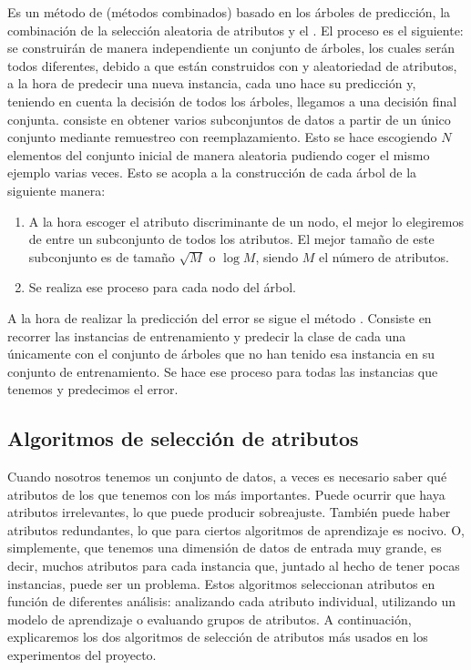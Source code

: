 Es un método de  (métodos combinados) basado en los árboles de predicción, la combinación de la selección aleatoria de atributos y el . El proceso es el siguiente: se construirán de manera independiente un conjunto de árboles, los cuales serán todos diferentes, debido a que están construidos con  y aleatoriedad de atributos, a la hora de predecir una nueva instancia, cada uno hace su predicción y, teniendo en cuenta la decisión de todos los árboles, llegamos a una decisión final conjunta.  consiste en obtener varios subconjuntos de datos a partir de un único conjunto mediante remuestreo con reemplazamiento. Esto se hace escogiendo $N$ elementos del conjunto inicial de manera aleatoria pudiendo coger el mismo ejemplo varias veces. Esto se acopla a la construcción de cada árbol de la siguiente manera:
\begin{enumerate}
	\item A la hora escoger el atributo discriminante de un nodo, el mejor lo elegiremos de entre un subconjunto de todos los atributos. El mejor tamaño de este subconjunto es de tamaño $\sqrt{M}$ o $\log M$, siendo $M$ el número de atributos.
	\item Se realiza ese proceso para cada nodo del árbol.
\end{enumerate}
A la hora de realizar la predicción del error se sigue el método . Consiste en recorrer las instancias de entrenamiento y predecir la clase de cada una únicamente con el conjunto de árboles que no han tenido esa instancia en su conjunto de entrenamiento. Se hace ese proceso para todas las instancias que tenemos y predecimos el error.

\subsection{Algoritmos de selección de atributos} \label{subsec:selectores}
Cuando nosotros tenemos un conjunto de datos, a veces es necesario saber qué atributos de los que tenemos con los más importantes. Puede ocurrir que haya atributos irrelevantes, lo que puede producir sobreajuste. También puede haber atributos redundantes, lo que para ciertos algoritmos de aprendizaje es nocivo. O, simplemente, que tenemos una dimensión de datos de entrada muy grande, es decir, muchos atributos para cada instancia que, juntado al hecho de tener pocas instancias, puede ser un problema. Estos algoritmos seleccionan atributos en función de diferentes análisis: analizando cada atributo individual, utilizando un modelo de aprendizaje o evaluando grupos de atributos. A continuación, explicaremos los dos algoritmos de selección de atributos más usados en los experimentos del proyecto.

